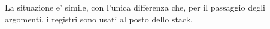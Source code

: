 
La situazione e' simile, con l'unica differenza che, per il passaggio degli argomenti, i registri sono usati al posto dello stack.







